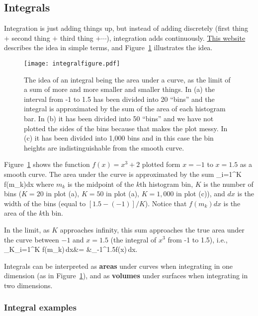 \subsection{Integrals}

Integration is just adding things up, but instead of adding discretely (first thing $+$ second thing $+$ third thing $+\cdots$), integration adds continuously. \href{https://www.mathsisfun.com/calculus/integration-introduction.html}{This website} describes the idea in simple terms, and Figure~\ref{fig:integral} illustrates the idea.

\begin{figure}[ht!]
\caption{\small The idea of an integral being the area under a curve, as the limit of a sum of more and more smaller and smaller things. In (a) the interval from -1 to 1.5 has been divided into 20 ``bins'' and the integral is approximated by the sum of the area of each histogram bar. In (b) it has been divided into 50 ``bins'' and we have not plotted the sides of the bins because that makes the plot messy. In (c) it has been divided into 1,000 bins and in this case the bin heights are indistinguishable from the smooth curve.}
\centering
\texttt{[image: integralfigure.pdf]}
\label{fig:integral}
\end{figure}

Figure~\ref{fig:integral} shows the function $f(x)=x^3+2$ plotted form $x=-1$ to $x=1.5$ as a smooth curve. The area under the curve is approximated by the sum
\be
\sum_{i=1}^K f(m_k)dx \nonumber
\ee
\noindent
where $m_k$ is the midpoint of the $k$th histogram bin, $K$ is the number of bins ($K=20$ in plot (a), $K=50$ in plot (a), $K=1,000$ in plot (c)), and $dx$ is the width of the bins (equal to $[1.5-(-1)]/K$). Notice that $f(m_k)dx$ is the area of the $k$th bin.

In the limit, as $K$ approaches infinity, this sum approaches the true area under the curve between $-1$ and $x=1.5$ (the integral of $x^3$ from -1 to 1.5), i.e., \\
\be
\lim_{K\rightarrow\infty}\sum_{i=1}^K f(m_k)\,dx&= &\int_{-1}^{1.5}f(x)\,dx. \nonumber
\ee

Integrals can be interpreted as \textbf{areas} under curves when integrating in one dimension (as in Figure~\ref{fig:integral}), and as \textbf{volumes} under surfaces when integrating in two dimensions.

\subsubsection{Integral examples}

